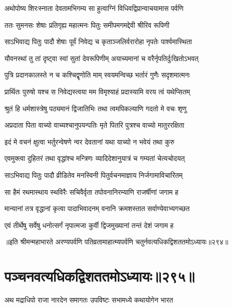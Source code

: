 \twolineshloka
{अथोपोष्य शिरःस्नाता देवतामभिगम्य सा}
{हुत्वाग्निं विधिवद्विप्रान्वाचयामास पर्वणि}


\twolineshloka
{ततः सुमनसः शेषाः प्रतिगृह्य महात्मनः}
{पितुः समीपमगमद्देवी श्रीरिव रूपिणी}


\twolineshloka
{साऽभिवाद्य पितुः पादौ शेषाः पूर्वं निवेद्य च}
{कृताञ्जलिर्वरारोहा नृपतेः पार्श्वमास्थिता}


\twolineshloka
{यौवनस्थां तु तां दृष्ट्वा स्वां सुतां देवरूपिणीम्}
{अयाच्यमानां च वरैर्नृपतिर्दुःखितोऽभवत्}




\twolineshloka
{पुत्रि प्रदानकालस्ते न च कश्चिद्वृणोति माम्}
{स्वयमन्विच्छ भर्तारं गुणैः सदृशमात्मनः}


\twolineshloka
{प्रार्थितः पुरुषो यश्च स निवेद्यस्त्वया मम}
{विमृश्याहं प्रदास्यामि वरय त्वं यथेप्सितम्}


\twolineshloka
{श्रुतं हि धर्मशास्त्रेषु पठ्यमानं द्विजातिभिः}
{तथा त्वमपिकल्याणि गदतो मे वचः शृणु}


\twolineshloka
{अप्रदाता पिता वाच्यो वाच्यश्चानुपयन्पतिः}
{मृते पितरि पुत्रश्च वाच्यो मातुररक्षिता}


\twolineshloka
{इदं मे वचनं क्षुत्वा भर्तुरन्वेषणे न्वर}
{देवतानां यथा याच्यो न भवेयं तथा कुरु}


\twolineshloka
{एवमुक्त्वा दुहितरं तथा वृद्धांश्च मन्त्रिणः}
{व्यादिदेशानुयात्रं च गम्यतां चेत्यचोदयत्}


\twolineshloka
{साऽभिवाद्य पितुः पादौ व्रीडितेव मनस्विनी}
{पितुर्वचनमाज्ञाय निर्जगामाविचारितम्}


\twolineshloka
{सा हैमं रथमास्थाय स्थविरैः सचिवैर्वृता}
{तपोवनानिरम्याणि राजर्षीणां जगाम ह}


\twolineshloka
{मान्यानां तत्र वृद्धानां कृत्वा पादाभिवादनम्}
{वनानि क्रमशस्तात सर्वाण्येवाभ्यगच्छत}


\twolineshloka
{एवं तीर्थेषु सर्वेषु धनोत्सर्गं नृपात्मजा}
{कुर्वी द्विजमुख्यानां तन्तं देशं जगाम ह}


॥इति श्रीमन्महाभारते अरण्यपर्वणि पतिव्रतामाहात्म्यपर्वणि चतुर्नवत्यधिकद्विशततमोऽध्यायः॥२९४॥


\chapter{पञ्चनवत्यधिकद्विशततमोऽध्यायः॥२९५॥}


\twolineshloka
{अथ मद्राधिपो राजा नारदेन समागतः}
{उपविष्टः सभामध्ये कथायोगेन भारत}


